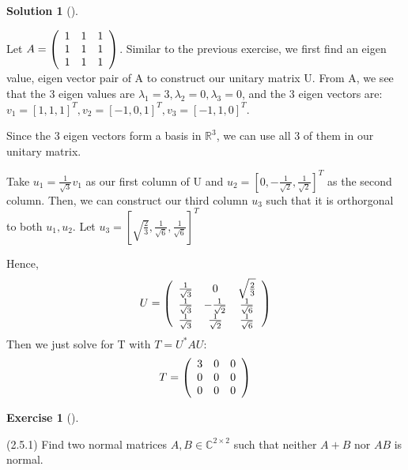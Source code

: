 \documentclass[numbers=enddot,12pt,final,onecolumn,notitlepage]{scrartcl}
\newcounter{exer}
\newcounter{sol}
\theoremstyle{definition}
\newtheorem{exmp}[exer]{Exercise}
\newenvironment{exercise}[1][]
{\begin{exmp}[#1]\begin{leftbar}}
        {\end{leftbar}\end{exmp}}
\newtheorem{solu}[sol]{Solution}
\newenvironment{solution}[1][]
{\begin{solu}[#1]\begin{leftbar}}
        {\end{leftbar}\end{solu}}
\begin{document}
\begin{solution}
	Let $A = \left(\begin{array}
				[c]{ccc}%
				1 & 1 & 1 \\
				1 & 1 & 1 \\
				1 & 1 & 1
			\end{array}\right)$.
	Similar to the previous exercise, we first find an eigen value, eigen vector pair of A to construct our unitary matrix U. From A, we see that the 3 eigen values are $\lambda_1 = 3, \lambda_2 = 0, \lambda_3 = 0$, and the 3 eigen vectors are: $v_1=[1,1,1]^{T}, v_2=[-1,0,1]^{T}, v_3=[-1,1,0]^{T}$.

	Since the 3 eigen vectors form a basis in $\mathbb{R}^3$, we can use all 3 of them in our unitary matrix.

	Take $u_1=\frac{1}{\sqrt{3}}v_1$ as our first column of U and $u_2 = [0, -\frac{1}{\sqrt{2}}, \frac{1}{\sqrt{2}}]^{T}$ as the second column. Then, we can construct our third column $u_3$ such that it is orthorgonal to both $u_1, u_2$. Let $u_3 = [\sqrt{\frac{2}{3}}, \frac{1}{\sqrt{6}}, \frac{1}{\sqrt{6}}]^{T}$

	Hence,
	\[
		U = \left(\begin{array}
				[c]{ccc}%
				\frac{1}{\sqrt{3}} & 0                   & \sqrt{\frac{2}{3}} \\
				\frac{1}{\sqrt{3}} & -\frac{1}{\sqrt{2}} & \frac{1}{\sqrt{6}} \\
				\frac{1}{\sqrt{3}} & \frac{1}{\sqrt{2}}  & \frac{1}{\sqrt{6}}
			\end{array}\right)
	\]
	Then we just solve for T with $T = U^{\ast}AU$:
	\[
		T = \left(\begin{array}
				[c]{ccc}%
				3 & 0 & 0 \\
				0 & 0 & 0 \\
				0 & 0 & 0
			\end{array}\right)
	\]

\end{solution}

\begin{exercise}
	\label{exe.schurtri.normal.not-additive} (2.5.1) Find two normal matrices
	$A,B\in\mathbb{C}^{2\times2}$ such that neither $A+B$ nor $AB$ is normal.
\end{exercise}
\end{document}

